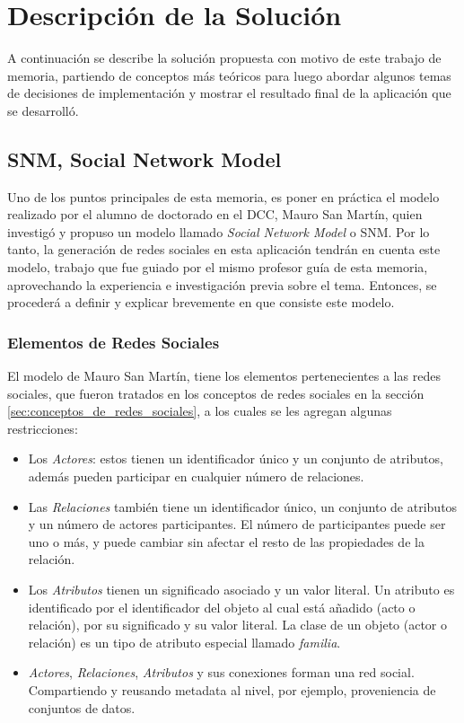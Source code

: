 \chapter{Descripción de la Solución}
\label{chap:descripcion_solucion}

A continuación se describe la solución propuesta con motivo de este trabajo de memoria, partiendo de conceptos más teóricos para luego abordar algunos temas de decisiones de implementación y mostrar el resultado final de la aplicación que se desarrolló.

\section{SNM, Social Network Model} %
\label{sec:snm_social_network_model}

Uno de los puntos principales de esta memoria, es poner en práctica el modelo realizado por el alumno de doctorado en el DCC, Mauro San Martín\cite{tesismauro}, quien investigó y propuso un modelo llamado \emph{Social Network Model} o SNM. Por lo tanto, la generación de redes sociales en esta aplicación tendrán en cuenta este modelo, trabajo que fue guiado por el mismo profesor guía de esta memoria, aprovechando la experiencia e investigación previa sobre el tema. Entonces, se procederá a definir y explicar brevemente en que consiste este modelo.

\subsection{Elementos de Redes Sociales} %
\label{sub:elementos_de_redes_sociales}

El modelo de Mauro San Martín, tiene los elementos pertenecientes a las redes sociales, que fueron tratados en los conceptos de redes sociales en la sección \ref{sec:conceptos_de_redes_sociales}, a los cuales se les agregan algunas restricciones:

  \begin{itemize}
    \item Los \emph{Actores}: estos tienen un identificador único y un conjunto de atributos, además pueden participar en cualquier número de relaciones.
    \item Las \emph{Relaciones} también tiene un identificador único, un conjunto de atributos y un número de actores participantes. El número de participantes puede ser uno o más, y puede cambiar sin afectar el resto de las propiedades de la relación.
    \item Los \emph{Atributos} tienen un significado asociado y un valor literal. Un atributo es identificado por el identificador del objeto al cual está añadido (acto o relación), por su significado y su valor literal. La clase de un objeto (actor o relación) es un tipo de atributo especial llamado \emph{familia}.
    \item \emph{Actores}, \emph{Relaciones}, \emph{Atributos} y sus conexiones forman una red social. Compartiendo y reusando metadata al nivel, por ejemplo, proveniencia de conjuntos de datos.
  \end{itemize}
  
